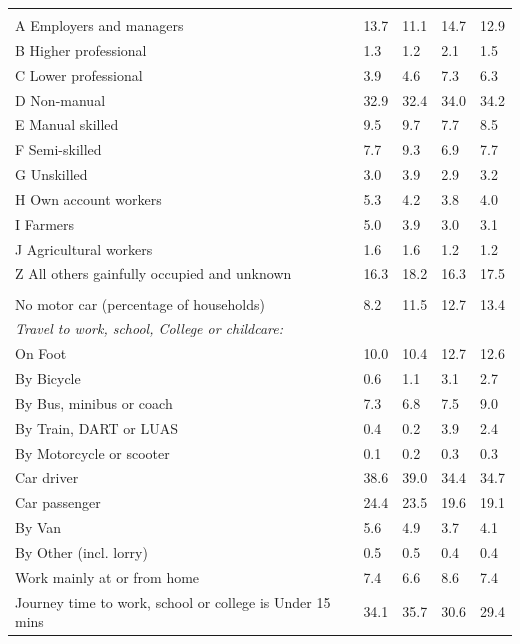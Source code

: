 \documentclass{article}
\begin{document}
\begin{table}[h]
\begin{tabular}{KTTTT}
\hline
    \\ 
    \hline
A Employers and managers & 13.7& 11.1& 14.7& 12.9\\
B Higher professional & 1.3& 1.2& 2.1& 1.5\\
C Lower professional & 3.9& 4.6& 7.3& 6.3\\
D Non-manual & 32.9& 32.4& 34.0& 34.2\\
E Manual skilled & 9.5& 9.7& 7.7& 8.5\\
F Semi-skilled & 7.7& 9.3& 6.9& 7.7\\
G Unskilled & 3.0& 3.9& 2.9& 3.2\\
H Own account workers & 5.3& 4.2& 3.8& 4.0\\
I Farmers & 5.0& 3.9& 3.0& 3.1\\
J Agricultural workers & 1.6& 1.6& 1.2& 1.2\\
Z All others gainfully occupied and unknown & 16.3& 18.2& 16.3& 17.5\\
\hline
{}\hline
    \\ 
    \hline
No motor car (percentage of households) &  8.2& 11.5& 12.7& 
13.4\\
    \hline 
\emph{Travel to work, school, College or childcare:} & & & \\
\quad On Foot & 10.0& 10.4& 12.7& 12.6\\ 
\quad By Bicycle & 0.6& 1.1& 3.1& 2.7\\ 
\quad By Bus, minibus or coach & 7.3& 6.8& 7.5& 9.0\\
\quad By Train, DART or LUAS & 0.4& 0.2& 3.9& 2.4\\
\quad By Motorcycle or scooter & 0.1& 0.2& 0.3& 0.3\\
\quad Car driver & 38.6 & 39.0& 34.4& 34.7\\
\quad Car passenger & 24.4& 23.5& 19.6& 19.1\\
\quad By Van & 5.6& 4.9& 3.7& 4.1\\
\quad By Other (incl. lorry) & 0.5& 0.5& 0.4& 0.4\\
    \hline
Work mainly at or from home & 7.4& 6.6& 8.6& 7.4\\
Journey time to work, school or college is Under 15 mins & 34.1& 35.7& 30.6& 29.4\\

\end{tabular}
\end{table}
\end{document}
